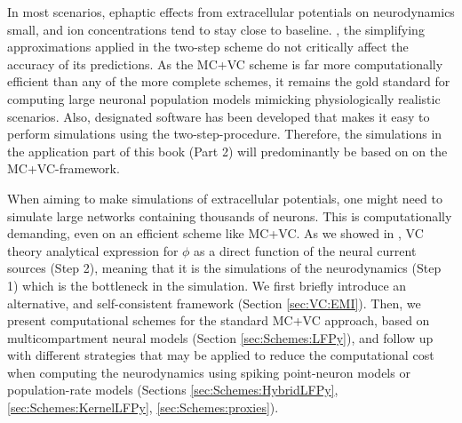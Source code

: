 In most scenarios, ephaptic effects from extracellular potentials on neurodynamics  small, 
and ion concentrations tend to stay close to baseline. 
, the simplifying approximations applied in the two-step scheme do not critically affect the accuracy of its predictions. As the MC+VC scheme is far more computationally efficient than any of the more complete schemes, 
it remains the gold standard for computing  large neuronal population models mimicking physiologically realistic scenarios. 
Also, designated software has been developed that makes it easy to perform simulations using the two-step-procedure. Therefore, the simulations in the application part of this book (Part 2) will predominantly be based on on the MC+VC-framework.

When aiming to make  simulations of extracellular potentials, one might need to simulate large networks containing thousands of neurons. This is computationally demanding, even on an efficient scheme like MC+VC.
As we showed in ,
VC theory  analytical expression for $\phi$ as a direct function of the neural current sources (Step 2), meaning that it is  the simulations of the neurodynamics (Step 1) which is the bottleneck in the simulation. 
We first briefly introduce an alternative, and self-consistent framework (Section \ref{sec:VC:EMI}).
Then, we present computational schemes for the standard MC+VC approach, based on multicompartment neural models (Section \ref{sec:Schemes:LFPy}), and follow up with different strategies that may be applied to reduce the computational cost when computing the neurodynamics using spiking point-neuron models or population-rate models (Sections \ref{sec:Schemes:HybridLFPy}, \ref{sec:Schemes:KernelLFPy}, \ref{sec:Schemes:proxies}). 



